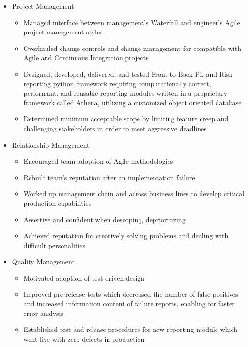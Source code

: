 \documentclass[11pt,letterpaper,roman]{moderncv}
\begin{document}
\begin{itemize}
    \item{Project Management}
        \begin{itemize}
            \item Managed interface between management's Waterfall and engineer's Agile project management styles
            \item Overhauled change controls and change management for compatible with Agile and Continuous Integration projects
            \item Designed, developed, delivered, and tested Front to Back PL and Risk reporting python framework\newline{}
                requiring computationally correct, performant, and reusable reporting modules written in a proprietary framework called Athena, utilizing a customized object oriented database\footnotemark
            \item Determined minimum acceptable scope by limiting feature creep and challenging stakeholders in order to meet aggressive deadlines
        \end{itemize}
    \item{Relationship Management}
        \begin{itemize}
            \item Encouraged team adoption of Agile methodologies
            \item Rebuilt team's reputation after an implementation failure
            \item Worked up management chain and across business lines to develop critical production capabilities
            \item Assertive and confident when descoping, deprioritizing
            \item Achieved reputation for creatively solving problems and dealing with difficult personalities
        \end{itemize}

    \item{Quality Management}
        \begin{itemize}
            \item Motivated adoption of test driven design
            \item Improved pre-release tests which decreased the number of false positives and increased information content of failure reports, enabling for faster error analysis
            \item Established test and release procedures for new reporting module which went live with zero defects in production\newline{}
        \end{itemize}
\end{itemize}
\end{document}
